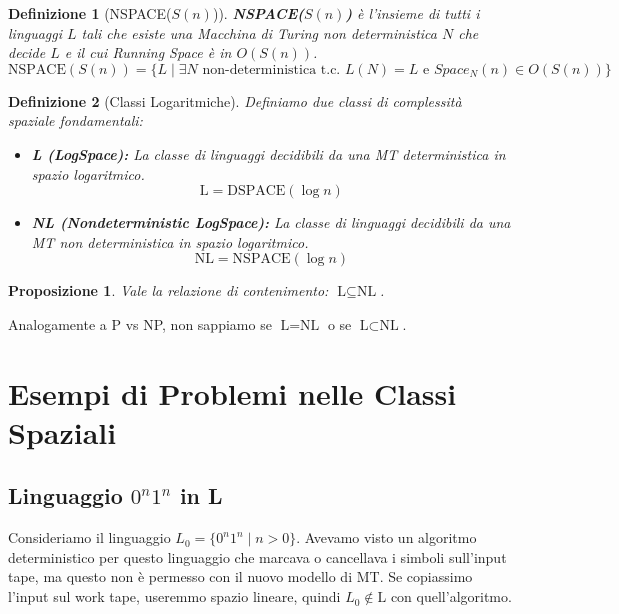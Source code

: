 \documentclass[a4paper]{article}
\newtheorem{definition}{Definizione}[section]
\newtheorem{proposition}{Proposizione}[section]
\begin{document}
\begin{definition}[NSPACE($S(n)$)]
\textbf{NSPACE($S(n)$)} è l'insieme di tutti i linguaggi $L$ tali che esiste una Macchina di Turing non deterministica $N$ che decide $L$ e il cui Running Space è in $O(S(n))$.
\[ \text{NSPACE}(S(n)) = \{ L \mid \exists N \text{ non-deterministica t.c. } L(N) = L \text{ e } Space_N(n) \in O(S(n)) \} \]
\end{definition}

\begin{definition}[Classi Logaritmiche]
Definiamo due classi di complessità spaziale fondamentali:
\begin{itemize}
    \item \textbf{L (LogSpace):} La classe di linguaggi decidibili da una MT deterministica in spazio logaritmico.
    \[ \text{L} = \text{DSPACE}(\log n) \]
    \item \textbf{NL (Nondeterministic LogSpace):} La classe di linguaggi decidibili da una MT non deterministica in spazio logaritmico.
    \[ \text{NL} = \text{NSPACE}(\log n) \]
\end{itemize}
\end{definition}

\begin{proposition}
Vale la relazione di contenimento: $\text{L} \subseteq \text{NL}$.
\end{proposition}
Analogamente a P vs NP, non sappiamo se $\text{L} = \text{NL}$ o se $\text{L} \subset \text{NL}$.

\section{Esempi di Problemi nelle Classi Spaziali}

\subsection{Linguaggio $0^n1^n$ in L}

Consideriamo il linguaggio $L_0 = \{0^n1^n \mid n > 0\}$.
Avevamo visto un algoritmo deterministico per questo linguaggio che marcava o cancellava i simboli sull'input tape, ma questo non è permesso con il nuovo modello di MT. Se copiassimo l'input sul work tape, useremmo spazio lineare, quindi $L_0 \notin \text{L}$ con quell'algoritmo.
\end{document}
